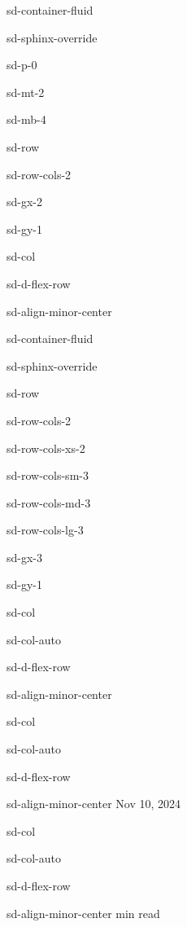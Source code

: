 \documentclass[letterpaper,10pt,english]{jupyterBook}
\begin{document}
\begin{sphinxuseclass}{sd-container-fluid}
\begin{sphinxuseclass}{sd-sphinx-override}
\begin{sphinxuseclass}{sd-p-0}
\begin{sphinxuseclass}{sd-mt-2}
\begin{sphinxuseclass}{sd-mb-4}
\begin{sphinxuseclass}{sd-row}
\begin{sphinxuseclass}{sd-row-cols-2}
\begin{sphinxuseclass}{sd-gx-2}
\begin{sphinxuseclass}{sd-gy-1}
\begin{sphinxuseclass}{sd-col}
\begin{sphinxuseclass}{sd-d-flex-row}
\begin{sphinxuseclass}{sd-align-minor-center}
\begin{sphinxuseclass}{sd-container-fluid}
\begin{sphinxuseclass}{sd-sphinx-override}
\begin{sphinxuseclass}{sd-row}
\begin{sphinxuseclass}{sd-row-cols-2}
\begin{sphinxuseclass}{sd-row-cols-xs-2}
\begin{sphinxuseclass}{sd-row-cols-sm-3}
\begin{sphinxuseclass}{sd-row-cols-md-3}
\begin{sphinxuseclass}{sd-row-cols-lg-3}
\begin{sphinxuseclass}{sd-gx-3}
\begin{sphinxuseclass}{sd-gy-1}
\begin{sphinxuseclass}{sd-col}
\begin{sphinxuseclass}{sd-col-auto}
\begin{sphinxuseclass}{sd-d-flex-row}
\begin{sphinxuseclass}{sd-align-minor-center}
\end{sphinxuseclass}
\end{sphinxuseclass}
\end{sphinxuseclass}
\end{sphinxuseclass}
\begin{sphinxuseclass}{sd-col}
\begin{sphinxuseclass}{sd-col-auto}
\begin{sphinxuseclass}{sd-d-flex-row}
\begin{sphinxuseclass}{sd-align-minor-center}
\sphinxAtStartPar
Nov 10, 2024

\end{sphinxuseclass}
\end{sphinxuseclass}
\end{sphinxuseclass}
\end{sphinxuseclass}
\begin{sphinxuseclass}{sd-col}
\begin{sphinxuseclass}{sd-col-auto}
\begin{sphinxuseclass}{sd-d-flex-row}
\begin{sphinxuseclass}{sd-align-minor-center}
 min read


\end{sphinxuseclass}
\end{sphinxuseclass}
\end{sphinxuseclass}
\end{sphinxuseclass}
\end{sphinxuseclass}
\end{sphinxuseclass}
\end{sphinxuseclass}
\end{sphinxuseclass}
\end{sphinxuseclass}
\end{sphinxuseclass}
\end{sphinxuseclass}
\end{sphinxuseclass}
\end{sphinxuseclass}
\end{sphinxuseclass}
\end{sphinxuseclass}
\end{sphinxuseclass}
\end{sphinxuseclass}
\end{sphinxuseclass}
\end{sphinxuseclass}
\end{sphinxuseclass}
\end{sphinxuseclass}
\end{sphinxuseclass}
\end{sphinxuseclass}
\end{sphinxuseclass}
\end{sphinxuseclass}
\end{sphinxuseclass}
\end{document}
